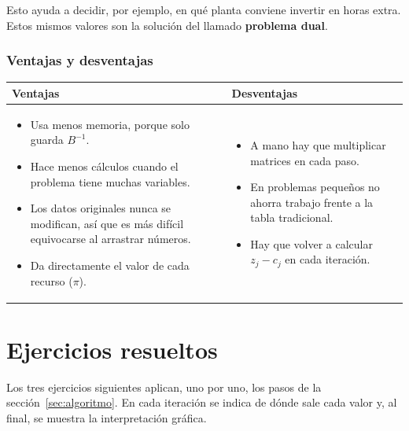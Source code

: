 \documentclass[11pt,a4paper]{article}
\newcommand{\Binv}{B^{-1}}
\begin{document}
Esto ayuda a decidir, por ejemplo, en qué planta conviene invertir en horas extra. Estos mismos valores son
la solución del llamado \textbf{problema dual}.

\section{Ventajas y desventajas}

\begin{center}\small
\begin{tabular}{p{7.2cm}p{7.2cm}}
\toprule
\textbf{Ventajas} & \textbf{Desventajas} \\
\midrule
\begin{itemize}[leftmargin=*, itemsep=2pt, topsep=2pt]
  \item Usa menos memoria, porque solo guarda $\Binv$.
  \item Hace menos cálculos cuando el problema tiene muchas variables.
  \item Los datos originales nunca se modifican, así que es más difícil equivocarse al arrastrar números.
  \item Da directamente el valor de cada recurso ($\pi$).
\end{itemize}
&
\begin{itemize}[leftmargin=*, itemsep=2pt, topsep=2pt]
  \item A mano hay que multiplicar matrices en cada paso.
  \item En problemas pequeños no ahorra trabajo frente a la tabla tradicional.
  \item Hay que volver a calcular $z_j - c_j$ en cada iteración.
\end{itemize}
\\
\bottomrule
\end{tabular}
\end{center}

\newpage
\part{Ejercicios resueltos}
\setcounter{section}{0}

Los tres ejercicios siguientes aplican, uno por uno, los pasos de la sección~\ref{sec:algoritmo}. En cada iteración se
indica de dónde sale cada valor y, al final, se muestra la interpretación gráfica.

\end{document}
